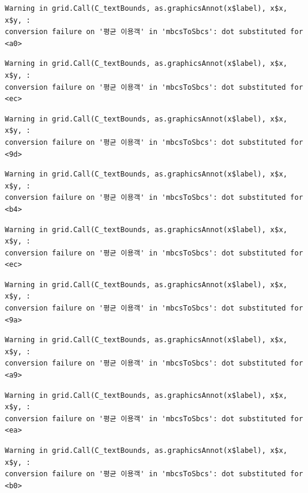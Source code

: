 \documentclass[
  letterpaper,
  DIV=11,
  numbers=noendperiod]{scrreprt}
\begin{document}
\begin{verbatim}
Warning in grid.Call(C_textBounds, as.graphicsAnnot(x$label), x$x, x$y, :
conversion failure on '평균 이용객' in 'mbcsToSbcs': dot substituted for <a0>
\end{verbatim}

\begin{verbatim}
Warning in grid.Call(C_textBounds, as.graphicsAnnot(x$label), x$x, x$y, :
conversion failure on '평균 이용객' in 'mbcsToSbcs': dot substituted for <ec>
\end{verbatim}

\begin{verbatim}
Warning in grid.Call(C_textBounds, as.graphicsAnnot(x$label), x$x, x$y, :
conversion failure on '평균 이용객' in 'mbcsToSbcs': dot substituted for <9d>
\end{verbatim}

\begin{verbatim}
Warning in grid.Call(C_textBounds, as.graphicsAnnot(x$label), x$x, x$y, :
conversion failure on '평균 이용객' in 'mbcsToSbcs': dot substituted for <b4>
\end{verbatim}

\begin{verbatim}
Warning in grid.Call(C_textBounds, as.graphicsAnnot(x$label), x$x, x$y, :
conversion failure on '평균 이용객' in 'mbcsToSbcs': dot substituted for <ec>
\end{verbatim}

\begin{verbatim}
Warning in grid.Call(C_textBounds, as.graphicsAnnot(x$label), x$x, x$y, :
conversion failure on '평균 이용객' in 'mbcsToSbcs': dot substituted for <9a>
\end{verbatim}

\begin{verbatim}
Warning in grid.Call(C_textBounds, as.graphicsAnnot(x$label), x$x, x$y, :
conversion failure on '평균 이용객' in 'mbcsToSbcs': dot substituted for <a9>
\end{verbatim}

\begin{verbatim}
Warning in grid.Call(C_textBounds, as.graphicsAnnot(x$label), x$x, x$y, :
conversion failure on '평균 이용객' in 'mbcsToSbcs': dot substituted for <ea>
\end{verbatim}

\begin{verbatim}
Warning in grid.Call(C_textBounds, as.graphicsAnnot(x$label), x$x, x$y, :
conversion failure on '평균 이용객' in 'mbcsToSbcs': dot substituted for <b0>
\end{verbatim}
\end{document}
